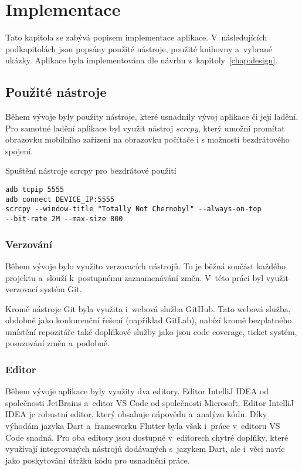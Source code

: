 \chapter{Implementace}
\label{chap:implementation}

Tato kapitola se zabývá popisem implementace aplikace.
V~následujících podkapitolách jsou popsány použité nástroje,
použité knihovny a~vybrané ukázky.
Aplikace byla implementována dle návrhu z~kapitoly~\ref{chap:design}.

\section{Použité nástroje}

Během vývoje byly použity nástroje,
které usnadnily vývoj aplikace či její ladění.
Pro samotné ladění aplikace byl využit nástroj \emph{scrcpy},
který umožní promítat obrazovku mobilního zařízení na obrazovku počítače
i s možností bezdrátového spojení.

\begin{listing}
    \caption{Spuštění nástroje scrcpy pro bezdrátové použití}
    \label{code:scrcpy}
    \begin{verbatim}
adb tcpip 5555
adb connect DEVICE_IP:5555
scrcpy --window-title "Totally Not Chernobyl" --always-on-top
--bit-rate 2M --max-size 800
    \end{verbatim}
\end{listing}

\subsection{Verzování}

Během vývoje bylo využito verzovacích nástrojů.
To je běžná součást každého projektu a~slouží k~postupnému zaznamenávání změn.
V~této práci byl využit verzovací systém Git.

Kromě nástroje Git byla využita i~webová služba GitHub.
Tato webová služba,
obdobně jako konkurenční řešení (například GitLab),
nabízí kromě bezplatného umístění repozitáře také doplňkové služby jako jsou
code coverage, ticket systém, posuzování změn a~podobně.

\pagebreak
\subsection{Editor}

Během vývoje aplikace byly využity dva editory.
Editor IntelliJ IDEA od společnosti JetBrains
a~editor VS Code od společnosti Microsoft.
Editor IntelliJ IDEA je robustní editor,
který obsahuje nápovědu a~analýzu kódu.
Díky výhodám jazyka Dart a~frameworku Flutter
byla však i~práce v~editoru VS Code snadná.
Pro oba editory jsou dostupné v~editorech chytré doplňky,
které využívají integrovaných nástrojů dodávaných s~jazykem Dart,
ale i~věci navíc jako poskytování útržků kódu pro usnadnění práce.

